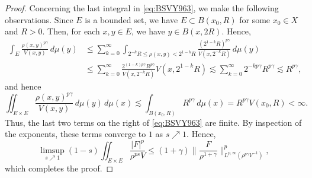 \documentclass[11pt]{amsart}
\theoremstyle{definition}
\theoremstyle{remark}
\numberwithin{equation}{section}
\newcommand{\BNorm}[2]{\Big\|#1\Big\|_{#2}}
\begin{document}
\begin{proof}
Concerning the last integral in \eqref{eq:BSVY963}, we make the following observations.
Since $E$ is a bounded set, we have $E\subset B(x_0,R)$ for some $x_0\in X$ and $R>0$. Then,
for each $x,y\in E$, we have $y\in B(x,2R)$. Hence,
\begin{equation*}
\begin{split}
  \int_E\frac{\rho(x,y)^{p\gamma}}{V(x,y)}\,d\mu(y)
  &\leq\sum_{k=0}^\infty\int_{2^{-k}R\leq
  \rho(x,y)<2^{1-k}R}\frac{(2^{1-k}R)^{p\gamma}}{V(x,2^{-k}R)}\,d\mu(y) \\
  &\leq\sum_{k=0}^\infty\frac{2^{(1-k)p\gamma}R^{p\gamma}}{V(x,2^{-k}R)}V(x,2^{1-k}R)
  \lesssim\sum_{k=0}^\infty 2^{-kp\gamma}R^{p\gamma}\lesssim R^{p\gamma},
\end{split}
\end{equation*}
and hence
\begin{equation*}
  \iint_{E\times E}\frac{\rho(x,y)^{p\gamma}}{V(x,y)}\,d\mu(y)\,d\mu(x)
  \lesssim\int_{B(x_0,R)}R^{p\gamma}\,d\mu(x)=R^{p\gamma}V(x_0,R)<\infty.
\end{equation*}
Thus, the last two terms on the right of \eqref{eq:BSVY963} are finite. By inspection of the
exponents, these terms converge to $1$ as $s\nearrow 1$. Hence,
\begin{equation*}
  \limsup_{s\nearrow 1}(1-s)\iint_{E\times E}
     \frac{|F|^p}{\rho^{ps}V}
   \leq(1+\gamma)\BNorm{\frac{F}{\rho^{1+\gamma}}}{L^{p,\infty}(\rho^{p\gamma}V^{-1})}^p,
\end{equation*}
which completes the proof. %


\end{proof}
\end{document}
